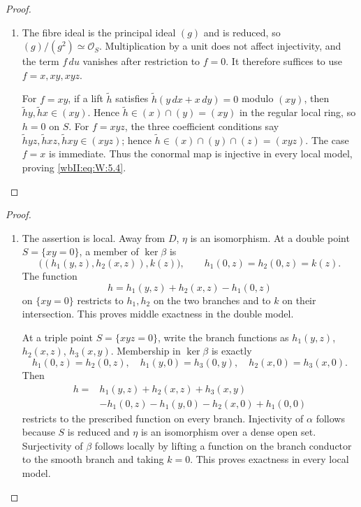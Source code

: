 \begin{proof}
\begin{enumerate}[label={$\langle1\rangle$\arabic*.},leftmargin=*]
\item 
The fibre ideal is the principal ideal $(g)$ and is reduced, so
$(g)/(g^2)\simeq\mathcal O_S$.  Multiplication by a unit does not affect
injectivity, and the term $f\,du$ vanishes after restriction to $f=0$.
It therefore suffices to use $f=x,xy,xyz$.

For $f=xy$, if a lift $\widetilde h$ satisfies
$\widetilde h(y\,dx+x\,dy)=0$ modulo $(xy)$, then
$\widetilde h y,\widetilde h x\in(xy)$.  Hence
$\widetilde h\in(x)\cap(y)=(xy)$ in the regular local ring, so $h=0$ on
$S$.  For $f=xyz$, the three coefficient conditions say
$\widetilde h yz,\widetilde h xz,\widetilde h xy\in(xyz)$; hence
$\widetilde h\in(x)\cap(y)\cap(z)=(xyz)$.  The case $f=x$ is immediate.
Thus the conormal map is injective in every local model, proving \eqref{wbII:eq:W:5.4}.

\end{enumerate}
\end{proof}

\begin{proof}
\begin{enumerate}[label={$\langle1\rangle$\arabic*.},leftmargin=*]
\item 
The assertion is local.  Away from $D$, $\eta$ is an isomorphism.
At a double point $S=\{xy=0\}$, a member of $\ker\beta$ is
\[
\bigl((h_1(y,z),h_2(x,z)),k(z)\bigr),
\qquad
h_1(0,z)=h_2(0,z)=k(z).
\]
The function
\[
h=h_1(y,z)+h_2(x,z)-h_1(0,z)
\]
on $\{xy=0\}$ restricts to $h_1,h_2$ on the two branches and to $k$ on
their intersection.  This proves middle exactness in the double model.

At a triple point $S=\{xyz=0\}$, write the branch functions as
$h_1(y,z)$, $h_2(x,z)$, $h_3(x,y)$.  Membership in $\ker\beta$ is exactly
\[
h_1(0,z)=h_2(0,z),\quad
h_1(y,0)=h_3(0,y),\quad
h_2(x,0)=h_3(x,0).
\]
Then
\[
\begin{split}
h={}&h_1(y,z)+h_2(x,z)+h_3(x,y)\\
&-h_1(0,z)-h_1(y,0)-h_2(x,0)+h_1(0,0)
\end{split}
\]
restricts to the prescribed function on every branch.  Injectivity of
$\alpha$ follows because $S$ is reduced and $\eta$ is an isomorphism over a
dense open set.  Surjectivity of $\beta$ follows locally by lifting a
function on the branch conductor to the smooth branch and taking $k=0$.
This proves exactness in every local model.

\end{enumerate}
\end{proof}
